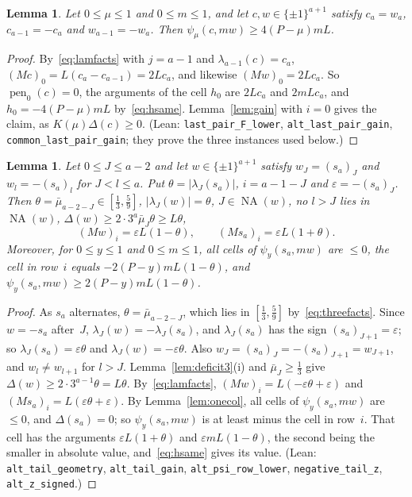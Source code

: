 \documentclass[11pt]{article}
\newtheorem{lemma}[theorem]{Lemma}
\theoremstyle{remark}
\newcommand{\NA}{\operatorname{NA}}
\begin{document}
\begin{lemma}\label{lem:lastpair}
Let $0\le\mu\le1$ and $0\le m\le1$, and let $c,w\in\{\pm1\}^{a+1}$ satisfy
$c_a=w_a$, $c_{a-1}=-c_a$ and $w_{a-1}=-w_a$. Then
$\psi_\mu(c,mw)\ge4(P-\mu)mL$.
\end{lemma}
\begin{proof}
By~\eqref{eq:lamfacts} with $j=a-1$ and $\lambda_{a-1}(c)=c_a$,
$(Mc)_0=L(c_a-c_{a-1})=2Lc_a$, and likewise $(Mw)_0=2Lc_a$. So
$\operatorname{pen}_0(c)=0$, the arguments of the cell $h_0$ are $2Lc_a$ and
$2mLc_a$, and $h_0=-4(P-\mu)mL$ by~\eqref{eq:hsame}. Lemma~\ref{lem:gain} with
$i=0$ gives the claim, as $K(\mu)\Delta(c)\ge0$. (Lean:
\texttt{last\_pair\_F\_lower}, \texttt{alt\_last\_pair\_gain},
\texttt{common\_last\_pair\_gain}; they prove the three instances used below.)
\end{proof}

\begin{lemma}\label{lem:alttail}
Let $0\le J\le a-2$ and let $w\in\{\pm1\}^{a+1}$ satisfy $w_J=(s_a)_J$ and
$w_l=-(s_a)_l$ for $J<l\le a$. Put $\theta=|\lambda_J(s_a)|$, $i=a-1-J$ and
$\varepsilon=-(s_a)_J$. Then $\theta=\bar\mu_{a-2-J}\in[\frac13,\frac59]$,
$|\lambda_J(w)|=\theta$, $J\in\NA(w)$, no $l>J$ lies in $\NA(w)$,
$\Delta(w)\ge2\cdot3^a\bar\mu_J\theta\ge L\theta$,
\[
(Mw)_i=\varepsilon L(1-\theta),\qquad (Ms_a)_i=\varepsilon L(1+\theta).
\]
Moreover, for $0\le y\le1$ and $0\le m\le1$, all cells of $\psi_y(s_a,mw)$ are
$\le0$, the cell in row~$i$ equals $-2(P-y)mL(1-\theta)$, and
$\psi_y(s_a,mw)\ge2(P-y)mL(1-\theta)$.
\end{lemma}
\begin{proof}
As $s_a$ alternates, $\theta=\bar\mu_{a-2-J}$, which lies in $[\frac13,\frac59]$
by~\eqref{eq:threefacts}. Since $w=-s_a$ after~$J$,
$\lambda_J(w)=-\lambda_J(s_a)$, and $\lambda_J(s_a)$ has the sign
$(s_a)_{J+1}=\varepsilon$; so $\lambda_J(s_a)=\varepsilon\theta$ and
$\lambda_J(w)=-\varepsilon\theta$. Also $w_J=(s_a)_J=-(s_a)_{J+1}=w_{J+1}$, and
$w_l\ne w_{l+1}$ for $l>J$. Lemma~\ref{lem:deficit3}(i) and $\bar\mu_J\ge\frac13$
give $\Delta(w)\ge2\cdot3^{a-1}\theta=L\theta$. By~\eqref{eq:lamfacts},
$(Mw)_i=L(-\varepsilon\theta+\varepsilon)$ and
$(Ms_a)_i=L(\varepsilon\theta+\varepsilon)$. By Lemma~\ref{lem:onecol}, all cells
of $\psi_y(s_a,mw)$ are $\le0$, and $\Delta(s_a)=0$; so $\psi_y(s_a,mw)$ is at
least minus the cell in row~$i$. That cell has the arguments
$\varepsilon L(1+\theta)$ and $\varepsilon mL(1-\theta)$, the second being the
smaller in absolute value, and~\eqref{eq:hsame} gives its value. (Lean:
\texttt{alt\_tail\_geometry}, \texttt{alt\_tail\_gain},
\texttt{alt\_psi\_row\_lower}, \texttt{negative\_tail\_z},
\texttt{alt\_z\_signed}.)
\end{proof}
\end{document}
